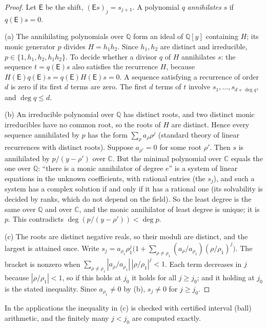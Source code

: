 \documentclass[11pt]{article}
\theoremstyle{plain}
\theoremstyle{definition}
\theoremstyle{remark}
\newcommand{\Q}{\mathbb{Q}}
\newcommand{\C}{\mathbb{C}}
\begin{document}
\begin{proof}
Let $\mathsf{E}$ be the shift, $(\mathsf{E}s)_j = s_{j+1}$. A polynomial $q$ \emph{annihilates} $s$ if $q(\mathsf{E})s = 0$.

(a) The annihilating polynomials over $\Q$ form an ideal of $\Q[y]$ containing $H$; its monic generator $p$ divides
$H = h_1 h_2$. Since $h_1, h_2$ are distinct and irreducible, $p \in \{1, h_1, h_2, h_1 h_2\}$. To decide whether a
divisor $q$ of $H$ annihilates $s$: the sequence $t = q(\mathsf{E}) s$ also satisfies the recurrence $H$, because
$H(\mathsf{E}) q(\mathsf{E}) s = q(\mathsf{E}) H(\mathsf{E}) s = 0$. A sequence satisfying a recurrence of order $d$ is zero if
its first $d$ terms are zero. The first $d$ terms of $t$ involve $s_1, \dots, s_{d + \deg q}$, and $\deg q \le d$.

(b) An irreducible polynomial over $\Q$ has distinct roots, and two distinct monic irreducibles have no common root,
so the roots of $H$ are distinct. Hence every sequence annihilated by $p$ has the form $\sum_\rho a_\rho \rho^j$ (standard
theory of linear recurrences with distinct roots). Suppose $a_{\rho'} = 0$ for some root $\rho'$. Then $s$ is
annihilated by $p / (y - \rho')$ over $\C$. But the minimal polynomial over $\C$ equals the one over $\Q$: ``there is a
monic annihilator of degree $e$'' is a system of linear equations in the unknown coefficients, with rational entries
(the $s_j$), and such a system has a complex solution if and only if it has a rational one (its solvability is decided
by ranks, which do not depend on the field). So the least degree is the same over $\Q$ and over $\C$, and the monic
annihilator of least degree is unique; it is $p$. This contradicts $\deg (p / (y - \rho')) < \deg p$.

(c) The roots are distinct negative reals, so their moduli are distinct, and the largest is attained once. Write
$s_j = a_{\rho_1}\rho_1^j\big(1 + \sum_{\rho \ne \rho_1} (a_\rho / a_{\rho_1}) (\rho / \rho_1)^j\big)$. The bracket is
nonzero when $\sum_{\rho \ne \rho_1} |a_\rho/a_{\rho_1}|\,|\rho/\rho_1|^j < 1$. Each term decreases in $j$ because
$|\rho/\rho_1| < 1$, so if this holds at $j_0$ it holds for all $j \ge j_0$; and it holding at $j_0$ is the stated
inequality. Since $a_{\rho_1} \ne 0$ by (b), $s_j \ne 0$ for $j \ge j_0$.
\end{proof}

In the applications the inequality in (c) is checked with certified interval (ball) arithmetic, and the finitely many
$j < j_0$ are computed exactly.
\end{document}
